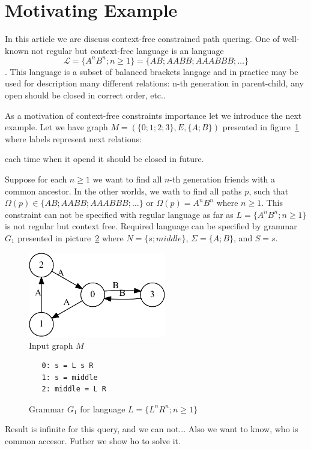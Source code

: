 \section{Motivating Example}

In this article we are discuss context-free constrained path quering. 
One of well-known not regular but context-free language is an language $$\mathcal{L} = \{A^n B^n; n \geq 1\} = \{AB; AABB; AAABBB; \dots\}$$.
This language is a subset of balanced brackets langage and in practice may be used for description many different relations: n-th generation in parent-child, any open should be closed in correct order, etc.. 

As a motivation of context-free constraints importance let we introduce the next example.
Let we have graph $M=(\{0;1;2;3\},E,\{A;B\})$ presented in figure~\ref{input} where labels represent next relations:

each time when it opend it should be closed in future.

Suppose for each $n \geq 1$ we want to find all $n$-th generation friends with a common ancestor.
In the other worlds, we wath to find all paths $p$, such that $\Omega(p) \in \{AB; AABB; AAABBB; \dots\}$ or $\Omega(p) = A^n B^n$ where $n \geq 1$.
This constraint can not be specified with regular language as far as $L=\{A^n B^n; n \geq 1\}$ is not regular but context free.
Required language can be specified by grammar $G_1$ presented in picture~\ref{grammarG} where $N = \{s; middle\}$, $\Sigma = \{A; B\}$, and $S = s$.

\begin{figure}[h]
    \begin{center}
        \includegraphics[width=6cm]{dot/input.pdf}
        \caption{Input graph $M$}
        \label{input}        
    \end{center}
\end{figure}

\begin{figure}[h]
   \begin{center}
\begin{verbatim}
   0: s = L s R 
   1: s = middle
   2: middle = L R
\end{verbatim}
   \caption{Grammar $G_1$ for language $L=\{L^n R^n; n \geq 1\}$}
   \label{grammarG}        
   \end{center}
\end{figure}


Result is infinite for this query, and we can not... 
Also we want to know, who is common accesor.
Futher we show ho to solve it.
